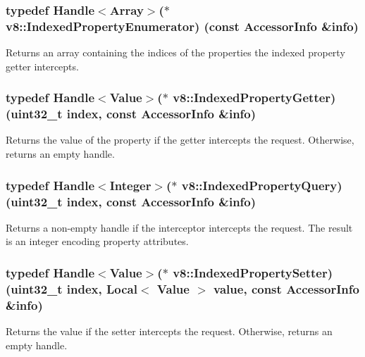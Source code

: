 \subsubsection[{Indexed\+Property\+Enumerator}]{\setlength{\rightskip}{0pt plus 5cm}typedef {\bf Handle}$<${\bf Array}$>$($\ast$ v8\+::\+Indexed\+Property\+Enumerator) (const {\bf Accessor\+Info} \&info)}\label{namespacev8_a15ab299eff53946ab483b762a4cb20dc}
Returns an array containing the indices of the properties the indexed property getter intercepts. \hypertarget{namespacev8_abf3be19b5157493da3859987cc50c6ab}{}
\subsubsection[{Indexed\+Property\+Getter}]{\setlength{\rightskip}{0pt plus 5cm}typedef {\bf Handle}$<${\bf Value}$>$($\ast$ v8\+::\+Indexed\+Property\+Getter) (uint32\+\_\+t index, const {\bf Accessor\+Info} \&info)}\label{namespacev8_abf3be19b5157493da3859987cc50c6ab}
Returns the value of the property if the getter intercepts the request. Otherwise, returns an empty handle. \hypertarget{namespacev8_ac84ffd0beb05009f30378ef45a065edf}{}
\subsubsection[{Indexed\+Property\+Query}]{\setlength{\rightskip}{0pt plus 5cm}typedef {\bf Handle}$<${\bf Integer}$>$($\ast$ v8\+::\+Indexed\+Property\+Query) (uint32\+\_\+t index, const {\bf Accessor\+Info} \&info)}\label{namespacev8_ac84ffd0beb05009f30378ef45a065edf}
Returns a non-\/empty handle if the interceptor intercepts the request. The result is an integer encoding property attributes. \hypertarget{namespacev8_a3ca53e294b9b695b3777af904ca942b6}{}
\subsubsection[{Indexed\+Property\+Setter}]{\setlength{\rightskip}{0pt plus 5cm}typedef {\bf Handle}$<${\bf Value}$>$($\ast$ v8\+::\+Indexed\+Property\+Setter) (uint32\+\_\+t index, {\bf Local}$<$ {\bf Value} $>$ value, const {\bf Accessor\+Info} \&info)}\label{namespacev8_a3ca53e294b9b695b3777af904ca942b6}
Returns the value if the setter intercepts the request. Otherwise, returns an empty handle. \hypertarget{namespacev8_aebbcc7837753e51112d944ad96520da1}{}
